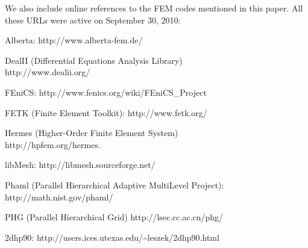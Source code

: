\documentclass[12pt]{elsarticle}
\begin{document}
\vbox{}
\vspace{6mm}
We also include online references to the FEM codes mentioned in this paper.
All these URLs were active on September 30, 2010:

\begin{thebibliography}{[codes]}

Alberta: http://www.alberta-fem.de/

DealII (Differential Equations Analysis Library) \\ http://www.dealii.org/

FEniCS: http://www.fenics.org/wiki/FEniCS\_Project

FETK (Finite Element Toolkit): http://www.fetk.org/

Hermes (Higher-Order Finite Element System) \\ http://hpfem.org/hermes.

libMesh: http://libmesh.sourceforge.net/

Phaml (Parallel Hierarchical Adaptive MultiLevel Project): \\ http://math.nist.gov/phaml/

PHG (Parallel Hierarchical Grid) http://lsec.cc.ac.cn/phg/

2dhp90: http://users.ices.utexas.edu/\~{}leszek/2dhp90.html

\end{thebibliography}







\end{document}
